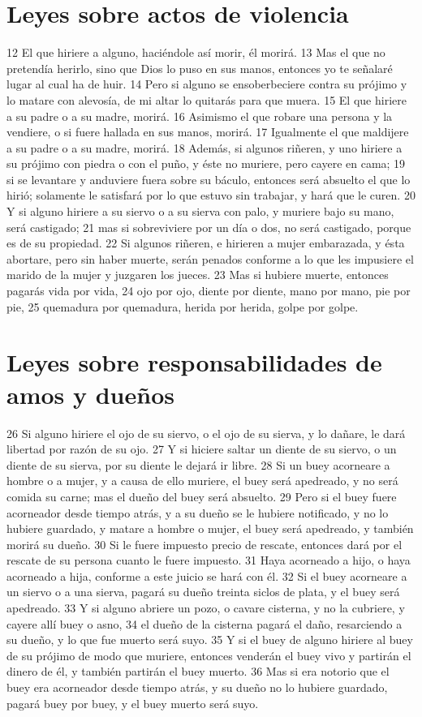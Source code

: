 \section*{Leyes sobre actos de violencia}

12 El que hiriere a alguno, haciéndole así morir, él morirá.
13 Mas el que no pretendía herirlo, sino que Dios lo puso en sus manos, entonces yo te señalaré lugar al cual ha de huir.
14 Pero si alguno se ensoberbeciere contra su prójimo y lo matare con alevosía, de mi altar lo quitarás para que muera.
15 El que hiriere a su padre o a su madre, morirá.
16 Asimismo el que robare una persona y la vendiere, o si fuere hallada en sus manos, morirá.
17 Igualmente el que maldijere a su padre o a su madre, morirá.
18 Además, si algunos riñeren, y uno hiriere a su prójimo con piedra o con el puño, y éste no muriere, pero cayere en cama;
19 si se levantare y anduviere fuera sobre su báculo, entonces será absuelto el que lo hirió; solamente le satisfará por lo que estuvo sin trabajar, y hará que le curen.
20 Y si alguno hiriere a su siervo o a su sierva con palo, y muriere bajo su mano, será castigado;
21 mas si sobreviviere por un día o dos, no será castigado, porque es de su propiedad.
22 Si algunos riñeren, e hirieren a mujer embarazada, y ésta abortare, pero sin haber muerte, serán penados conforme a lo que les impusiere el marido de la mujer y juzgaren los jueces.
23 Mas si hubiere muerte, entonces pagarás vida por vida,
24 ojo por ojo, diente por diente, mano por mano, pie por pie,
25 quemadura por quemadura, herida por herida, golpe por golpe.

\section*{Leyes sobre responsabilidades de amos y dueños}

26 Si alguno hiriere el ojo de su siervo, o el ojo de su sierva, y lo dañare, le dará libertad por razón de su ojo.
27 Y si hiciere saltar un diente de su siervo, o un diente de su sierva, por su diente le dejará ir libre.
28 Si un buey acorneare a hombre o a mujer, y a causa de ello muriere, el buey será apedreado, y no será comida su carne; mas el dueño del buey será absuelto.
29 Pero si el buey fuere acorneador desde tiempo atrás, y a su dueño se le hubiere notificado, y no lo hubiere guardado, y matare a hombre o mujer, el buey será apedreado, y también morirá su dueño.
30 Si le fuere impuesto precio de rescate, entonces dará por el rescate de su persona cuanto le fuere impuesto.
31 Haya acorneado a hijo, o haya acorneado a hija, conforme a este juicio se hará con él.
32 Si el buey acorneare a un siervo o a una sierva, pagará su dueño treinta siclos de plata,  y el buey será apedreado.
33 Y si alguno abriere un pozo, o cavare cisterna, y no la cubriere, y cayere allí buey o asno,
34 el dueño de la cisterna pagará el daño, resarciendo a su dueño, y lo que fue muerto será suyo.
35 Y si el buey de alguno hiriere al buey de su prójimo de modo que muriere, entonces venderán el buey vivo y partirán el dinero de él, y también partirán el buey muerto.
36 Mas si era notorio que el buey era acorneador desde tiempo atrás, y su dueño no lo hubiere guardado, pagará buey por buey, y el buey muerto será suyo.

